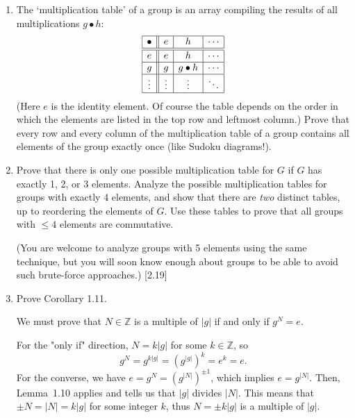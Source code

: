 \begin{enumerate}
    \item The `multiplication table' of a group is an array compiling the results of all multiplications $g \bullet h$:
          \[
              \begin{array}{|c||c|c|c|}
                  \hline
                  \bullet & e      & h           & \cdots \\
                  \hline\hline
                  e       & e      & h           & \cdots \\
                  \hline
                  g       & g      & g \bullet h & \cdots \\
                  \hline
                  \vdots  & \vdots & \vdots      & \ddots \\
                  \hline
              \end{array}
          \]
          (Here $e$ is the identity element. Of course the table depends on the order in which the elements are listed in the top row and leftmost column.) Prove that every row and every column of the multiplication table of a group contains all elements of the group exactly once (like Sudoku diagrams!).

    \item Prove that there is only one possible multiplication table for $G$ if $G$ has exactly 1, 2, or 3 elements. Analyze the possible multiplication tables for groups with exactly 4 elements, and show that there are \textit{two} distinct tables, up to reordering the elements of $G$. Use these tables to prove that all groups with $\le 4$ elements are commutative.

          (You are welcome to analyze groups with 5 elements using the same technique, but you will soon know enough about groups to be able to avoid such brute-force approaches.) [2.19]

    \item Prove Corollary 1.11.

          \begin{solution}
              We must prove that $N \in \mathbb{Z}$ is a multiple of $|g|$ if and only if $g^N = e$.

              For the "only if" direction, $N = k|g|$ for some $k \in \mathbb{Z}$, so \[ g^N = g^{k|g|} = (g^{|g|})^k = e^k = e. \]
              For the converse, we have $e = g^N = (g^{|N|})^{\pm1}$, which implies $e = g^{|N|}$. Then, Lemma~1.10 applies and tells us that $|g|$ divides $|N|$. This means that $\pm N = |N| = k|g|$ for some integer $k$, thus $N = \pm k|g|$ is a multiple of $|g|$.
          \end{solution}


\end{enumerate}
